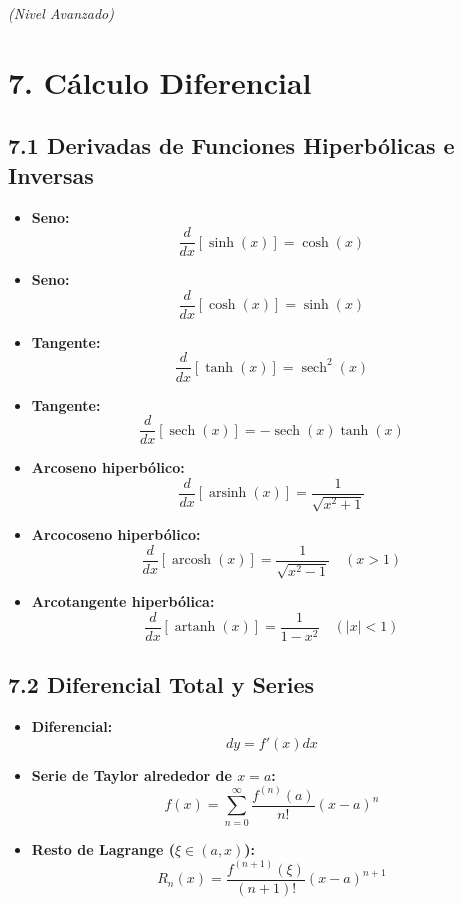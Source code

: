 \documentclass[11pt,a4paper]{article}
\begin{document}
\textit{(Nivel Avanzado)}

\section*{7. Cálculo Diferencial}

\subsection*{7.1 Derivadas de Funciones Hiperbólicas e Inversas}

\begin{itemize}
  \item \textbf{Seno:}
  \[
    \frac{d}{dx}[\sinh(x)] = \cosh(x)
  \]
  \item \textbf{Seno:}
  \[
    \frac{d}{dx}[\cosh(x)] = \sinh(x)
  \]
  \item \textbf{Tangente:}
  \[
    \frac{d}{dx}[\tanh(x)] = \operatorname{sech}^2(x)
  \]
  \item \textbf{Tangente:}
  \[
    \frac{d}{dx}[\operatorname{sech}(x)] = -\operatorname{sech}(x)\tanh(x)
  \]
  \item \textbf{Arcoseno hiperbólico:}
  \[
    \frac{d}{dx}[\operatorname{arsinh}(x)] = \frac{1}{\sqrt{x^2 + 1}}
  \]
  \item \textbf{Arcocoseno hiperbólico:}
  \[
    \frac{d}{dx}[\operatorname{arcosh}(x)] = \frac{1}{\sqrt{x^2 - 1}} \quad (x > 1)
  \]
  \item \textbf{Arcotangente hiperbólica:}
  \[
    \frac{d}{dx}[\operatorname{artanh}(x)] = \frac{1}{1 - x^2} \quad (|x| < 1)
  \]
\end{itemize}

\subsection*{7.2 Diferencial Total y Series}

\begin{itemize}
  \item \textbf{Diferencial:}
  \[
    dy = f'(x) dx
  \]
  \item \textbf{Serie de Taylor alrededor de $x = a$:}
  \[
    f(x) = \sum_{n=0}^\infty \frac{f^{(n)}(a)}{n!} (x - a)^n
  \]
  \item \textbf{Resto de Lagrange ($\xi \in (a, x)$):}
  \[
    R_n(x) = \frac{f^{(n+1)}(\xi)}{(n+1)!} (x - a)^{n+1}
  \]
\end{itemize}
\end{document}
